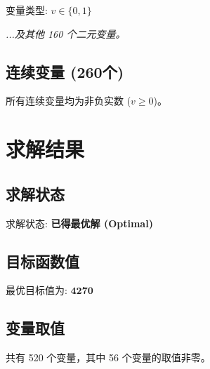 \documentclass[a4paper,10pt]{article}
\begin{document}
变量类型: $v \in \{0,1\}$

\textit{...及其他 160 个二元变量。}

\subsection{连续变量 (260个)}

所有连续变量均为非负实数 ($v \geq 0$)。

\section{求解结果}

\subsection{求解状态}

求解状态: \textbf{已得最优解 (Optimal)}

\subsection{目标函数值}

最优目标值为: $\mathbf{4270}$

\subsection{变量取值}

共有 520 个变量，其中 56 个变量的取值非零。
\end{document}
